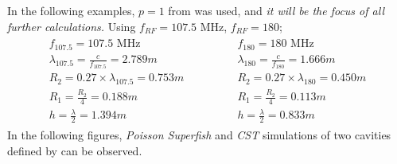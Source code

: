 \documentclass[a4paper,oneside,12pt]{report}
\numberwithin{equation}{chapter}
\begin{document}
In the following examples, $p=1$ from  was used, and \textit{it will be the focus of all further calculations.}
Using $f_{RF}=107.5$ MHz, $f_{RF}=180$;
\begin{eqnarray} \label{eq:107_180_MHZ_cavity_design_parameters}
    \begin{aligned}
        f_{107.5} = 107.5 \textrm{ MHz} \\
        \lambda_{107.5}  = \frac{c}{f_{107.5}} = 2.789 m \\
        R_2 = 0.27 \times \lambda_{107.5} = 0.753 m \\
        R_1 = \frac{R_2}{4} = 0.188 m \\
        h = \frac{\lambda}{2} = 1.394 m 
    \end{aligned}
    \qquad\qquad
    \begin{aligned}
        f_{180} = 180 \textrm{ MHz} \\
        \lambda_{180}  = \frac{c}{f_{180}} = 1.666 m \\
        R_2 = 0.27 \times\lambda_{180} = 0.450 m \\
        R_1 = \frac{R_2}{4} = 0.113 m \\
        h = \frac{\lambda}{2} = 0.833 m 
    \end{aligned}
\end{eqnarray}
In the following figures, \textit{Poisson Superfish} and \textit{CST} simulations of two cavities defined by  can be observed.
\end{document}
